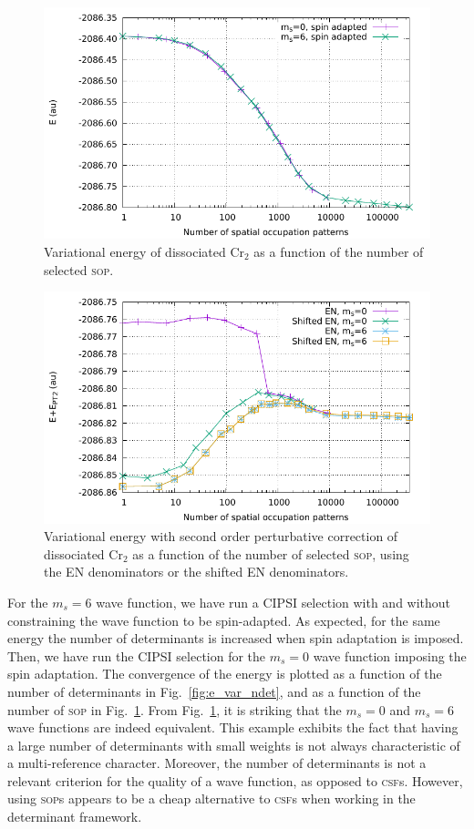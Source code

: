 \documentclass[aip,jcp,reprint,showkeys]{revtex4-1}
\newcommand{\sop}{\textsc{sop}}
\newcommand{\csf}{\textsc{csf}}
\begin{document}
\begin{figure}
\includegraphics[width=0.9\columnwidth]{e_var_nsop}
\caption{Variational energy of dissociated Cr$_2$ as a function of the number of
selected \sop{}.}
\label{fig:e_var_nsop}
\end{figure}

\begin{figure}
\includegraphics[width=0.9\columnwidth]{e_pt2_nsop}
\caption{Variational energy with second order perturbative correction of
dissociated Cr$_2$ as a function of the number of selected \sop{}, using
the EN denominators or the shifted EN denominators.}
\label{fig:e_pt2_nsop}
\end{figure}

For the $m_s=6$ wave function, we have run a CIPSI selection with and without
constraining the wave function to be spin-adapted.
As expected, for the same energy the number of
determinants is increased when spin adaptation is imposed. Then, we have run the
CIPSI selection for the $m_s=0$ wave function imposing the
spin adaptation. The convergence of the energy is plotted as a function of the
number of determinants in Fig.~\ref{fig:e_var_ndet}, and as a function of
the number of \sop{} in Fig.~\ref{fig:e_var_nsop}.
From Fig.~\ref{fig:e_var_nsop}, it is striking that the $m_s=0$ and $m_s=6$
wave functions are indeed equivalent.
This example exhibits the fact that having a large number of determinants with
small weights is not always characteristic of a multi-reference character.
Moreover, the number of determinants is not a relevant criterion for the
quality of a wave function, as opposed to \csf s. However, using \sop s
appears to be a cheap alternative to \csf s when working in the determinant
framework.
\end{document}
